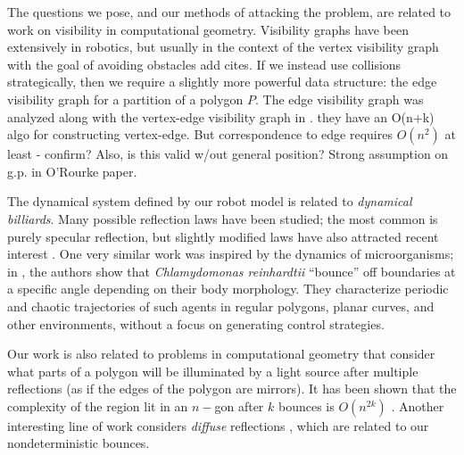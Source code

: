 \documentclass[]{styles/svproc}  %
\begin{document}
The questions we pose, and our methods of attacking the problem, are related to
work on visibility in computational geometry. Visibility graphs have been
extensively in robotics, but usually in the context of the vertex visibility
graph with the goal of avoiding obstacles {\color{red} add cites}.  If we instead use collisions strategically, then we require a slightly more
powerful data structure: the edge visibility graph for a partition of a polygon
$P$. The edge visibility graph was analyzed along with the vertex-edge
visibility graph in \cite{rourke_viz}. {\color{red} they have an O(n+k) algo for
constructing vertex-edge. But correspondence to edge requires $O(n^2)$ at least
- confirm? Also, is this valid w/out general position? Strong assumption on g.p.
in O'Rourke paper}.


The dynamical system defined by our robot model is related to \emph{dynamical billiards}. Many 
possible reflection laws have been studied;
the most common is purely specular reflection, but slightly modified laws have
also attracted recent interest \cite{DelMagno2014,billiards,pinball}. 
One very similar work was inspired by the dynamics of microorganisms; in \cite{microorganism2017}, 
the authors show that 
\textit{Chlamydomonas reinhardtii} ``bounce'' off boundaries at a specific
angle depending on their body morphology. They characterize periodic and
chaotic trajectories of such agents in regular polygons, planar curves, and other environments, 
without a focus on generating control strategies.

Our work is also related to problems in computational geometry that consider what
parts of a polygon will be illuminated by a light source after multiple
reflections (as if the edges of the polygon are mirrors). It has been shown that
the complexity of the region lit in an $n-$gon after $k$ bounces is $O(n^{2k})$
\cite{Aronov1996}. Another interesting line of work considers \emph{diffuse}
reflections \cite{prasad1998visibility}, which are related to our nondeterministic bounces.
\end{document}
